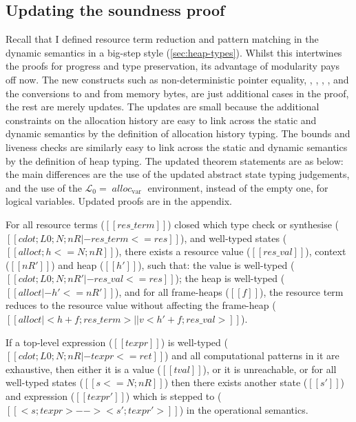 \subsection{Updating the soundness proof}

Recall that I defined resource term reduction and pattern matching in the
dynamic semantics in a big-step style (\cref{sec:heap-types}). Whilst this
intertwines the proofs for progress and type preservation, its advantage of
modularity pays off now. The new constructs such as non-deterministic pointer
equality, , ,
, , and the conversions
to and from memory bytes, are just additional cases in the proof, the rest are
merely updates. The updates are small because the additional
constraints on the allocation history are easy to link across the static and
dynamic semantics by the definition of allocation history typing. The bounds
and liveness checks are similarly easy to link across the static and dynamic
semantics by the definition of heap typing. The updated theorem statements are
as below: the main differences are the use of the updated abstract state typing
judgements, and the use of the $\mathcal{L}_0 = {\; \mathit{alloc}_\mathrm{var}
\;}$ environment, instead of the empty one, for logical variables. Updated
proofs are in the appendix.

\begin{theorem}
For all resource terms ($[[ res\_term ]]$) closed which type check or synthesise
($[[ cdot ; L0 ; N ; nR |- res\_term <= res ]]$), and well-typed states
($[[ alloct ; h <= N ; nR ]]$), there exists a resource value ($[[ res\_val ]]$),
context ($[[ nR' ]]$) and heap ($[[ h' ]]$), such that: the value is well-typed
($[[ cdot ; L0 ; N ; nR' |- res\_val <= res ]]$); the heap is well-typed
($[[ alloct |- h' <= nR' ]]$), and for all frame-heaps ($[[ f ]]$), the resource term
reduces to the resource value without affecting the frame-heap
($[[ alloct | < h + f ; res\_term > ||v < h' + f ; res\_val > ]]$).
\end{theorem}

\begin{theorem}
If a top-level expression ($[[ texpr ]]$) is well-typed
($[[ cdot ; L0 ; N ; nR |- texpr <= ret ]]$) and all computational patterns
in it are exhaustive, then either it is a value ($[[ tval ]]$), or it is
unreachable, or for all well-typed states ($[[ s <= N ; nR ]]$)
then there exists another state ($[[ s' ]]$) and expression ($[[ texpr' ]]$)
which is stepped to ($[[ < s ; texpr > --> < s' ; texpr' > ]]$)
in the operational semantics.
\end{theorem}

